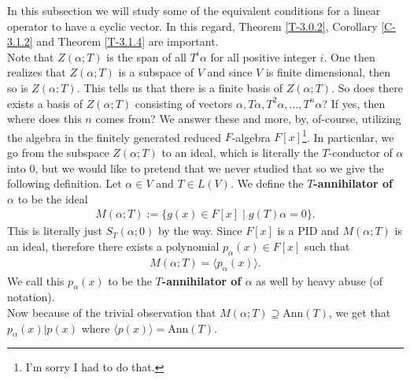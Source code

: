 \documentclass[letterpaper,11pt,twoside]{article}
\theoremstyle{definition}
\theoremstyle{definition}
\theoremstyle{definition}
\theoremstyle{definition}
\theoremstyle{definition}
\theoremstyle{definition}
\theoremstyle{remark}
\theoremstyle{definition}
\newcommand{\Ann}[1]{\text{Ann}\left(#1\right)}
\newcommand{\gen}[1]{\langle #1\rangle}
\begin{document}
    In this subsection we will study some of the equivalent conditions for a linear operator to have a cyclic vector. In this regard, Theorem \ref{T-3.0.2}, Corollary \ref{C-3.1.2} and Theorem \ref{T-3.1.4} are important.\\
    
    Note that $Z(\alpha;T)$ is the span of all $T^i\alpha$ for all positive integer $i$. One then realizes that $Z(\alpha;T) $ is a subspace of $V$ and since $V$ is finite dimensional, then so is $Z(\alpha;T)$. This tells us that there is a finite basis of $Z(\alpha;T)$. So does there exists a basis of $Z(\alpha;T)$ consisting of vectors $\alpha, T\alpha,T^2\alpha,\dots, T^n\alpha$? If yes, then where does this $n$ comes from? We answer these and more, by, of-course, utilizing the algebra in the finitely generated reduced $F$-algebra $F[x]$\footnote{I'm sorry I had to do that.}. In particular, we go from the subspace $Z(\alpha;T)$ to an ideal, which is literally the $T$-conductor of $\alpha$ into 0, but we would like to pretend that we never studied that so we give the following definition. Let $\alpha \in V$ and $T\in L(V)$. We define the \textbf{$T$-annihilator of $\alpha$} to be the ideal 
    \begin{align*}
       M(\alpha;T):=\{g(x)\in F[x]\;\vert\; g(T)\alpha = 0\}.
    \end{align*}
    This is literally just $S_T(\alpha;0)$ by the way. Since $F[x]$ is a PID and $M(\alpha;T)$ is an ideal, therefore there exists a polynomial $p_\alpha(x)\in F[x]$ such that 
    \begin{align}
        M(\alpha;T) = \gen{p_\alpha(x)}.
    \end{align}
    We call this $p_\alpha(x)$ to be the \textbf{$T$-annihilator of $\alpha$} as well by heavy abuse (of notation). \\
    
    Now because of the trivial observation that $M(\alpha;T) \supseteq \Ann{T}$, we get that $p_\alpha(x)| p(x)$ where $\gen{p(x)} = \Ann{T}$.\\
    
\end{document}
